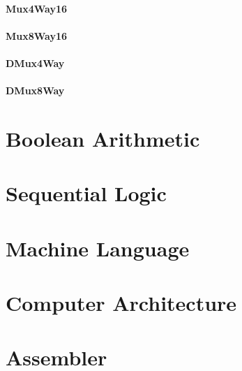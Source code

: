 \documentclass[11pt]{article}
\begin{document}
    \hypertarget{mux4way16}{%
\paragraph{Mux4Way16}\label{mux4way16}}

    \hypertarget{mux8way16}{%
\paragraph{Mux8Way16}\label{mux8way16}}

    \hypertarget{dmux4way}{%
\paragraph{DMux4Way}\label{dmux4way}}

    \hypertarget{dmux8way}{%
\paragraph{DMux8Way}\label{dmux8way}}

    \hypertarget{boolean-arithmetic}{%
\section{Boolean Arithmetic}\label{boolean-arithmetic}}

    \hypertarget{sequential-logic}{%
\section{Sequential Logic}\label{sequential-logic}}

    \hypertarget{machine-language}{%
\section{Machine Language}\label{machine-language}}

    \hypertarget{computer-architecture}{%
\section{Computer Architecture}\label{computer-architecture}}

    \hypertarget{assembler}{%
\section{Assembler}\label{assembler}}


    
    
    
    
\end{document}
